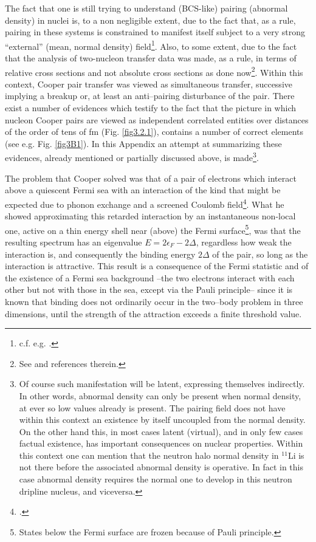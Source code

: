 \begin{subappendices}
The fact that one is still trying to understand (BCS-like) pairing (abnormal   density) in nuclei is, to a non negligible extent, due to the fact that, as a rule, pairing in these systems is constrained to manifest itself subject to a very strong ``external'' (mean, normal density) field\footnote{c.f. e.g. \cite{Matsuo:13}.}. Also, to some extent, due to the fact that the analysis of two-nucleon transfer data was made, as a rule, in terms of relative cross sections and not absolute cross sections as done now\footnote{See \cite{Potel:13} and references therein.}. Within this context, Cooper pair transfer was viewed as simultaneous transfer, successive implying a breakup or, at least an anti--pairing disturbance of the pair. There exist a number of evidences which testify to the fact that the picture in which nucleon Cooper pairs are viewed as independent correlated entities over distances of the order of tens of fm (Fig. \ref{fig3.2.1}), contains a number of correct elements (see e.g. Fig. \ref{fig3B1}). In this Appendix an attempt at summarizing these evidences, already mentioned or partially discussed above, is made\footnote{Of course such manifestation will be latent, expressing themselves indirectly. In other words, abnormal density can only be present when normal density, at ever so low values already is present. The pairing field does not have within this context an existence by itself uncoupled from the normal density. On the other hand this, in most cases latent (virtual), and in only few cases factual existence, has important consequences on nuclear properties. Within this context one can mention that the neutron halo normal density in $^{11}$Li is not there before the associated abnormal density is operative. In fact in this case abnormal density requires the normal one to develop in this neutron dripline nucleus, and viceversa.}.


 The problem that Cooper solved was that of a pair of electrons which interact above a quiescent Fermi sea with  an interaction of the kind that might be expected due to  phonon exchange and a screened Coulomb field\footnote{\cite{Cooper:56}.}. What he showed approximating this retarded interaction by an instantaneous non-local one, active on a thin energy shell near (above) the Fermi surface\footnote{States below the Fermi surface are frozen because of Pauli principle.}, was that the resulting spectrum has an eigenvalue $E=2\epsilon_F-2\Delta$, regardless how weak the interaction is, and consequently the binding energy $2\Delta$ of the pair, so long as the interaction is attractive. This result is a consequence of the Fermi statistic and of the existence of a Fermi sea background --the two electrons interact with each other but not with those in the sea, except via the Pauli principle-- since it is  known that binding does not ordinarily occur in the two--body problem in three dimensions, until the strength of the attraction exceeds a finite threshold value.


\end{subappendices}
